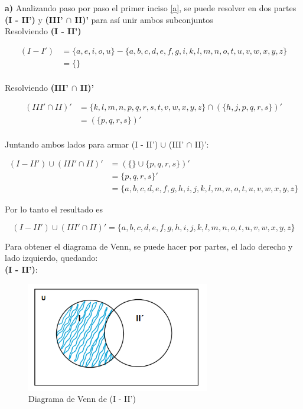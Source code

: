 \newpage


\textbf{a)} Analizando paso por paso el primer inciso \ref{a}, se puede resolver en dos partes \textbf{(I - II')} y \textbf{(III' $\cap$ II)'} para así unir ambos subconjuntos \\

Resolviendo \textbf{(I - II')}

\begin{align*}
(I - I')  &= \{a, e, i, o, u\} - \{ a, b, c, d, e, f, g, i, k, l, m, n, o, t, u, v, w, x, y, z \}  \\
  &= \{\} \\
\end{align*}

Resolviendo \textbf{(III' $\cap$ II)'}

\begin{align*}
(III' \cap II)'  &= \{ k, l, m, n, p, q, r, s, t, v, w, x, y, z \} \cap (\{ h, j, p, q, r, s  \})'  \\
  &= (\{p, q, r, s \} )'\\
\end{align*}

Juntando ambos lados para armar (I - II') $\cup$ (III' $\cap$ II)':

\begin{align*}
(I - II') \cup (III' \cap II)' &= ( \{ \} \cup \{p, q, r, s \} )' \\
  &= \{p, q, r, s \}' \\
  &= \{ a, b, c, d, e, f, g, h, i, j, k, l, m, n, o, t, u, v, w, x, y, z \} 
\end{align*}

Por lo tanto el resultado es

\begin{equation*}
    \boxed{(I - II') \cup (III' \cap II)' = \{ a, b, c, d, e, f, g, h, i, j, k, l, m, n, o, t, u, v, w, x, y, z \} }
\end{equation*}

Para obtener el diagrama de Venn, se puede hacer por partes, el lado derecho y lado izquierdo, quedando: \\

\textbf{(I - II')}: 

\begin{figure}[htbp]
\centering
\includegraphics[width=8cm]{a/aa.png}
\caption[]{Diagrama de Venn de (I - II')}
\end{figure} 

